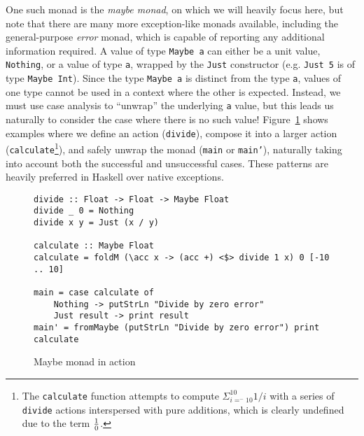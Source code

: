 \documentclass[11pt]{article}
\begin{document}
One such monad is the \emph{maybe monad}, on which we will heavily focus here, but note that there are many more exception-like monads available, including the general-purpose \emph{error} monad, which is capable of reporting any additional information required.
A value of type \texttt{Maybe a} can either be a unit value, \texttt{Nothing}, or a value of type \texttt{a}, wrapped by the \texttt{Just} constructor (e.g. \texttt{Just 5} is of type \texttt{Maybe Int}).
Since the type \texttt{Maybe a} is distinct from the type \texttt{a}, values of one type cannot be used in a context where the other is expected.
Instead, we must use case analysis to ``unwrap'' the underlying \texttt{a} value, but this leads us naturally to consider the case where there is no such value!
Figure~\ref{maybeMonad} shows examples where we define an action (\texttt{divide}), compose it into a larger action (\texttt{calculate}\footnote{The \texttt{calculate} function attempts to compute $\Sigma_{i=^-10}^{10}{1/i}$ with a series of \texttt{divide} actions interspersed with pure additions, which is clearly undefined due to the term $1\over0$.}), and safely unwrap the monad (\texttt{main} or \texttt{main'}), naturally taking into account both the successful and unsuccessful cases.
These patterns are heavily preferred in Haskell over native exceptions.

\begin{figure}[h]
\caption{Maybe monad in action}
\label{maybeMonad}
\begin{verbatim}
divide :: Float -> Float -> Maybe Float
divide _ 0 = Nothing
divide x y = Just (x / y)

calculate :: Maybe Float
calculate = foldM (\acc x -> (acc +) <$> divide 1 x) 0 [-10 .. 10]

main = case calculate of
    Nothing -> putStrLn "Divide by zero error"
    Just result -> print result
main' = fromMaybe (putStrLn "Divide by zero error") print calculate
\end{verbatim}
\end{figure}
\end{document}
